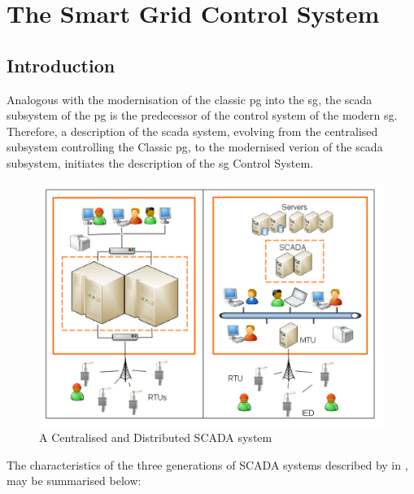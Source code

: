 
\chapter{The Smart Grid Control System}


\section{Introduction}

Analogous with the modernisation of the classic \acrlong{pg} into the \acrlong{sg}, the \acrshort{scada} subsystem of the \acrshort{pg} is the predecessor of the control system of the modern \acrlong{sg}.
Therefore, a description of the \acrshort{scada} system, evolving from the centralised subsystem controlling the Classic \acrshort{pg}, to the modernised verion of the \acrshort{scada} subsystem, initiates the description of the \acrlong{sg} Control System. 



 
   \begin{figure}[ht]

    \includegraphics[width=\textwidth]{figures/SCADA-CentralisedAndDistributed.png}    


\caption[A Centralised and Distributed SCADA system]{A Centralised and Distributed SCADA system \cite[p. 123]{alcaraz2012security}}
\label{fig:SCADA-CentralisedAndDistributed}
\end{figure}



The characteristics of the three generations of SCADA systems described by  in \cite{alcaraz2012security}, may be summarised below:
 

